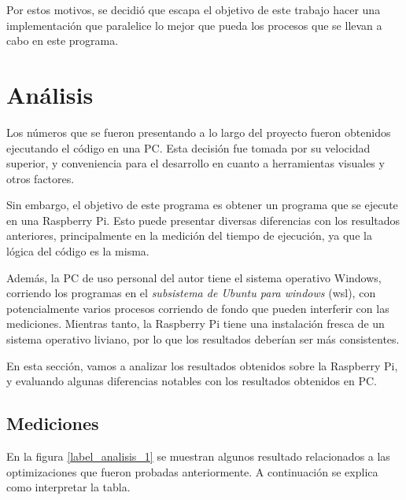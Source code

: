 \documentclass{article}
\begin{document}
Por estos motivos, se decidió que escapa el objetivo de este trabajo hacer una implementación que paralelice lo mejor que pueda los procesos que se llevan a cabo en este programa.

\section{Análisis}

Los números que se fueron presentando a lo largo del proyecto fueron obtenidos ejecutando el código en una PC. Esta decisión fue tomada por su velocidad superior, y conveniencia para el desarrollo en cuanto a herramientas visuales y otros factores.

Sin embargo, el objetivo de este programa es obtener un programa que se ejecute en una Raspberry Pi. Esto puede presentar diversas diferencias con los resultados anteriores, principalmente en la medición del tiempo de ejecución, ya que la lógica del código es la misma.

Además, la PC de uso personal del autor tiene el sistema operativo Windows, corriendo los programas en el \emph{subsistema de Ubuntu para windows} (wsl), con potencialmente varios procesos corriendo de fondo que pueden interferir con las mediciones. Mientras tanto, la Raspberry Pi tiene una instalación fresca de un sistema operativo liviano, por lo que los resultados deberían ser más consistentes. 

En esta sección, vamos a analizar los resultados obtenidos sobre la Raspberry Pi, y evaluando algunas diferencias notables con los resultados obtenidos en PC.

\subsection{Mediciones}
En la figura \ref{label_analisis_1} se muestran algunos resultado relacionados a las optimizaciones que fueron probadas anteriormente. A continuación se explica como interpretar la tabla.
\end{document}
